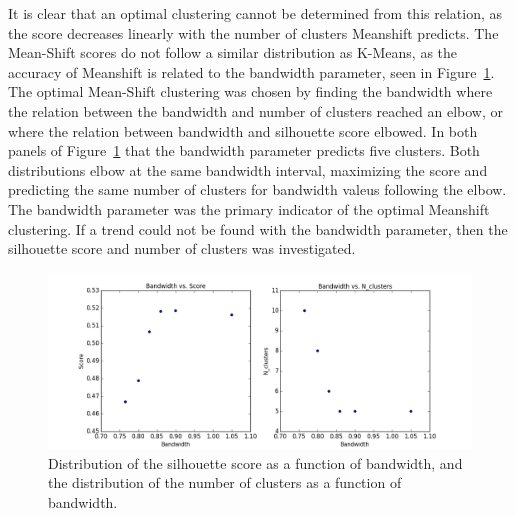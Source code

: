 It is clear that an optimal clustering cannot be determined from this relation, as the score decreases linearly with the number of clusters Meanshift predicts.
The Mean-Shift scores do not follow a similar distribution as K-Means, as the accuracy of Meanshift is related to the bandwidth parameter, seen in Figure~\ref{fig:bwscore}.
The optimal Mean-Shift clustering was chosen by finding the bandwidth where the relation between the bandwidth and number of clusters reached an elbow, or where the relation between bandwidth and silhouette score elbowed.
In both panels of Figure~\ref{fig:bwscore} that the bandwidth parameter predicts five clusters.
Both distributions elbow at the same bandwidth interval, maximizing the score and predicting the same number of clusters for bandwidth valeus following the elbow.
The bandwidth parameter was the primary indicator of the optimal Meanshift clustering.
If a trend could not be found with the bandwidth parameter, then the silhouette score and number of clusters was investigated.

\begin{figure}[H]
\centering
\includegraphics[width=\linewidth]{figs/methods/meanshift_parameters}
\caption{Distribution of the silhouette score as a function of bandwidth, and the distribution of the number of clusters as a function of bandwidth.}
\label{fig:bwscore}
\end{figure}